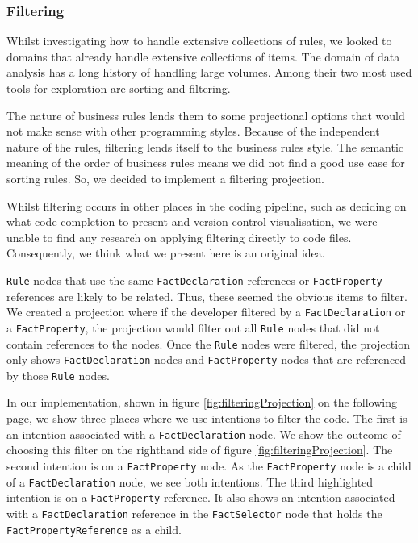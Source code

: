 \subsubsection{Filtering}
Whilst investigating how to handle extensive collections of rules, we looked to domains that already handle extensive collections of items.
The domain of data analysis has a long history of handling large volumes.
Among their two most used tools for exploration are sorting and filtering.

The nature of business rules lends them to some projectional options that would not make sense with other programming styles.
Because of the independent nature of the rules, filtering lends itself to the business rules style.
The semantic meaning of the order of business rules means we did not find a good use case for sorting rules.
So, we decided to implement a filtering projection.

Whilst filtering occurs in other places in the coding pipeline, such as deciding on what code completion to present\cite{hou2010towards} and version control visualisation\cite{yoon2013visualization}, we were unable to find any research on applying filtering directly to code files.
Consequently, we think what we present here is an original idea.

\texttt{Rule} nodes that use the same \texttt{FactDeclaration} references or \texttt{FactProperty} references are likely to be related.
Thus, these seemed the obvious items to filter.
We created a projection where if the developer filtered by a \texttt{FactDeclaration} or a \texttt{FactProperty}, the projection would filter out all \texttt{Rule} nodes that did not contain references to the nodes.
Once the \texttt{Rule} nodes were filtered, the projection only shows \texttt{FactDeclaration} nodes and \texttt{FactProperty} nodes that are referenced by those \texttt{Rule} nodes.

In our implementation, shown in figure \ref{fig:filteringProjection} on the following page, we show three places where we use intentions to filter the code.
The first is an intention associated with a \texttt{FactDeclaration} node.
We show the outcome of choosing this filter on the righthand side of figure \ref{fig:filteringProjection}.
The second intention is on a \texttt{FactProperty} node.
As the \texttt{FactProperty} node is a child of a \texttt{FactDeclaration} node, we see both intentions.
The third highlighted intention is on a \texttt{FactProperty} reference.
It also shows an intention associated with a \texttt{FactDeclaration} reference in the \texttt{FactSelector} node that holds the \texttt{FactPropertyReference} as a child.

